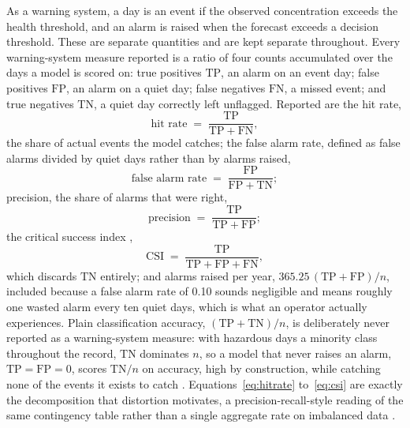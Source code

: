 \documentclass[12pt,a4paper]{report}
\begin{document}
As a warning system, a day is an event if the observed concentration exceeds the
health threshold, and an alarm is raised when the forecast exceeds a decision
threshold. These are separate quantities and are kept separate throughout.
Every warning-system measure reported is a ratio of four counts accumulated
over the days a model is scored on: true positives $\mathrm{TP}$, an alarm
on an event day; false positives $\mathrm{FP}$, an alarm on a quiet day;
false negatives $\mathrm{FN}$, a missed event; and true negatives
$\mathrm{TN}$, a quiet day correctly left unflagged. Reported are the hit
rate,
\begin{equation}
\text{hit rate} \;=\; \frac{\mathrm{TP}}{\mathrm{TP}+\mathrm{FN}},
\label{eq:hitrate}
\end{equation}
the share of actual events the model catches; the false alarm rate, defined
as false alarms divided by quiet days rather than by alarms raised,
\begin{equation}
\text{false alarm rate} \;=\; \frac{\mathrm{FP}}{\mathrm{FP}+\mathrm{TN}};
\label{eq:farrate}
\end{equation}
precision, the share of alarms that were right,
\begin{equation}
\text{precision} \;=\; \frac{\mathrm{TP}}{\mathrm{TP}+\mathrm{FP}};
\label{eq:precision}
\end{equation}
the critical success index \citep{schaefer1990csi},
\begin{equation}
\mathrm{CSI} \;=\; \frac{\mathrm{TP}}{\mathrm{TP}+\mathrm{FP}+\mathrm{FN}},
\label{eq:csi}
\end{equation}
which discards $\mathrm{TN}$ entirely; and alarms raised per year,
$365.25\,(\mathrm{TP}+\mathrm{FP})/n$, included because a false alarm rate of
0.10 sounds negligible and means roughly one wasted alarm every ten quiet
days, which is what an operator actually experiences. Plain classification
accuracy, $(\mathrm{TP}+\mathrm{TN})/n$, is deliberately never reported as a
warning-system measure: with hazardous days a minority class throughout the
record, $\mathrm{TN}$ dominates $n$, so a model that never raises an alarm,
$\mathrm{TP}=\mathrm{FP}=0$, scores $\mathrm{TN}/n$ on accuracy, high by
construction, while catching none of the events it exists to catch
\citep{he2009imbalance}. Equations~\ref{eq:hitrate} to~\ref{eq:csi} are
exactly the decomposition that distortion motivates, a precision-recall-style
reading of the same contingency table rather than a single aggregate rate on
imbalanced data \citep{saito2015prplot}.
\end{document}
